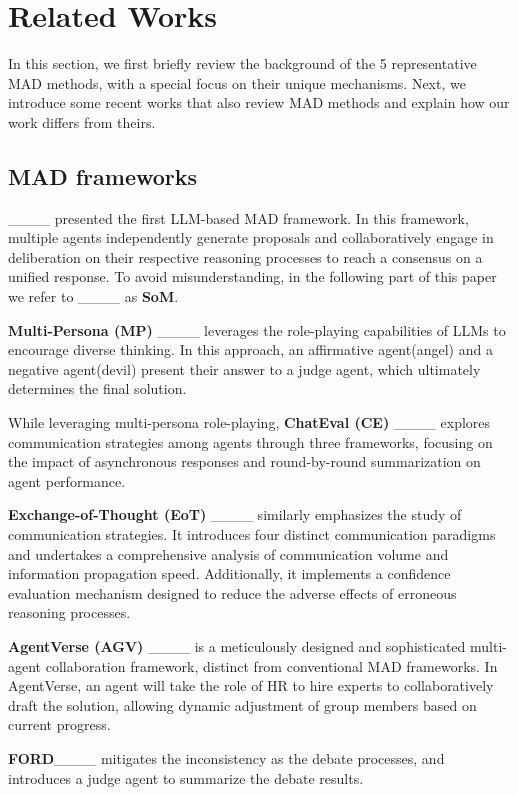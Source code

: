 \section{Related Works}
In this section, we first briefly review the background of the 5 representative MAD methods, with a special focus on their unique mechanisms. Next, we introduce some recent works that also review MAD methods and explain how our work differs from theirs.

\subsection{MAD frameworks}

____ presented the first LLM-based MAD framework. In this framework, multiple agents independently generate proposals and collaboratively engage in deliberation on their respective reasoning processes to reach a consensus on a unified response. To avoid misunderstanding, in the following part of this paper we refer to ____ as \textbf{SoM}.

\textbf{Multi-Persona (MP)} ____ leverages the role-playing capabilities of LLMs to encourage diverse thinking. In this approach, an affirmative agent(angel) and a negative agent(devil) present their answer to a judge agent, which ultimately determines the final solution.

While leveraging multi-persona role-playing, \textbf{ChatEval (CE)} ____ explores communication strategies among agents through three frameworks, focusing on the impact of asynchronous responses and round-by-round summarization on agent performance.


\textbf{Exchange-of-Thought (EoT)} ____ similarly emphasizes the study of communication strategies. It introduces four distinct communication paradigms and undertakes a comprehensive analysis of communication volume and information propagation speed. Additionally, it implements a confidence evaluation mechanism designed to reduce the adverse effects of erroneous reasoning processes.


\textbf{AgentVerse (AGV)} ____ is a meticulously designed and sophisticated multi-agent collaboration framework, distinct from conventional MAD frameworks. In AgentVerse, an agent will take the role of HR to hire experts to collaboratively draft the solution, allowing dynamic adjustment of group members based on current progress.

\textbf{FORD}____ mitigates the inconsistency as the debate processes, and introduces a judge agent to summarize the debate results.

